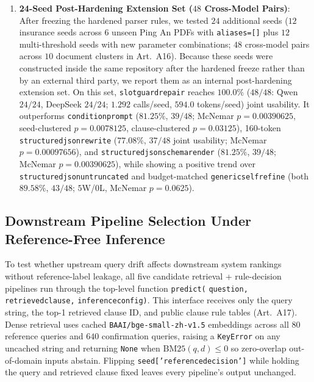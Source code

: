 \documentclass[10pt,twocolumn]{article}
\renewcommand{\_}{\textunderscore\allowbreak}
\begin{document}
\begin{enumerate}[leftmargin=*,nosep]
  \item \textbf{24-Seed Post-Hardening Extension Set ($48$ Cross-Model Pairs)}: After freezing the hardened parser rules, we tested $24$ additional seeds ($12$ insurance seeds across $6$ unseen Ping An PDFs with \texttt{aliases=[]} plus $12$ multi-threshold seeds with new parameter combinations; $48$ cross-model pairs across $10$ document clusters in Art.~A16). Because these seeds were constructed inside the same repository after the hardened freeze rather than by an external third party, we report them as an internal post-hardening extension set. On this set, \texttt{slot\_guard\_repair} reaches $100.0\%$ ($48/48$: Qwen $24/24$, DeepSeek $24/24$; $1.292$ calls/seed, $594.0$ tokens/seed) joint usability. It outperforms \texttt{condition\_prompt} ($81.25\%$, $39/48$; McNemar $p=0.00390625$, seed-clustered $p=0.0078125$, clause-clustered $p=0.03125$), 160-token \texttt{structured\_json\_rewrite} ($77.08\%$, $37/48$ joint usability; McNemar $p=0.00097656$), and \texttt{structured\_json\_schema\_render} ($81.25\%$, $39/48$; McNemar $p=0.00390625$), while showing a positive trend over \texttt{structured\_json\_untruncated\_320} and budget-matched \texttt{generic\_self\_refine} (both $89.58\%$, $43/48$; $5$W/$0$L, McNemar $p=0.0625$).
\end{enumerate}

\subsection{Downstream Pipeline Selection Under Reference-Free Inference}
To test whether upstream query drift affects downstream system rankings without reference-label leakage, all five candidate retrieval + rule-decision pipelines run through the top-level function \texttt{predict(} \allowbreak \texttt{question,} \allowbreak \texttt{retrieved\_clause,} \allowbreak \texttt{inference\_config)}. This interface receives only the query string, the top-1 retrieved clause ID, and public clause rule tables (Art.~A17). Dense retrieval uses cached \texttt{BAAI/bge-small-zh-v1.5} embeddings across all $80$ reference queries and $640$ confirmation queries, raising a \texttt{KeyError} on any uncached string and returning \texttt{None} when $\text{BM25}(q, d) \le 0$ so zero-overlap out-of-domain inputs abstain. Flipping \texttt{seed['reference\_decision']} while holding the query and retrieved clause fixed leaves every pipeline's output unchanged.
\end{document}
